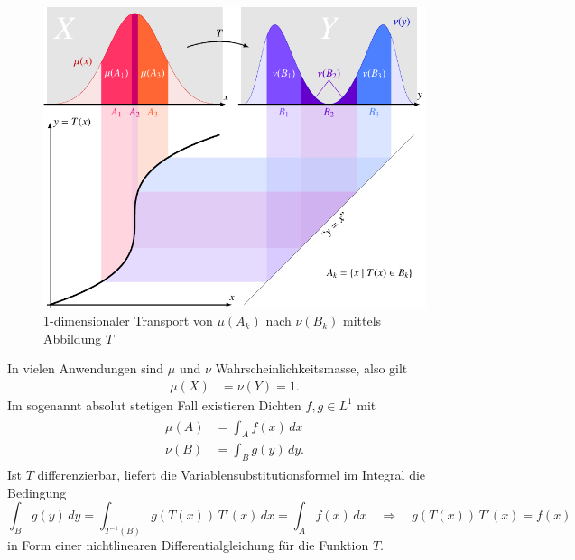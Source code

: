 \begin{figure}
\centering
\includegraphics{papers/mongekant/images/t}
\caption{1-dimensionaler Transport von $\mu(A_k)$ nach $\nu(B_k)$ mittels Abbildung $T$}
\label{mongekant:fig:optimal_transport}
\end{figure}

In vielen Anwendungen sind $\mu$ und $\nu$ Wahrscheinlichkeitsmasse,
also gilt
\begin{align*}
\mu(X)
&=
\nu(Y)
=
1
.
\end{align*}
Im sogenannt absolut stetigen Fall
existieren Dichten $f,g\in L^{1}$ mit
\begin{align}
\begin{aligned}
\mu(A)
&=
\int_A f(x) \, dx
\\
\nu(B)
&=
\int_B g(y) \, dy
.
\end{aligned}
\label{mongekant:eq:absolute_continuity}
\end{align}
Ist $T$ differenzierbar, liefert die Variablensubstitutionsformel im Integral
die Bedingung
\[
\int_B g(y)\,dy
=
\int_{T^{-1}(B)} g(T(x))\, T'(x)\,dx
=
\int_A f(x)\,dx
\quad\Rightarrow\quad
g(T(x))\, T'(x) = f(x)
\]
in Form einer nichtlinearen Differentialgleichung für die Funktion $T$.

